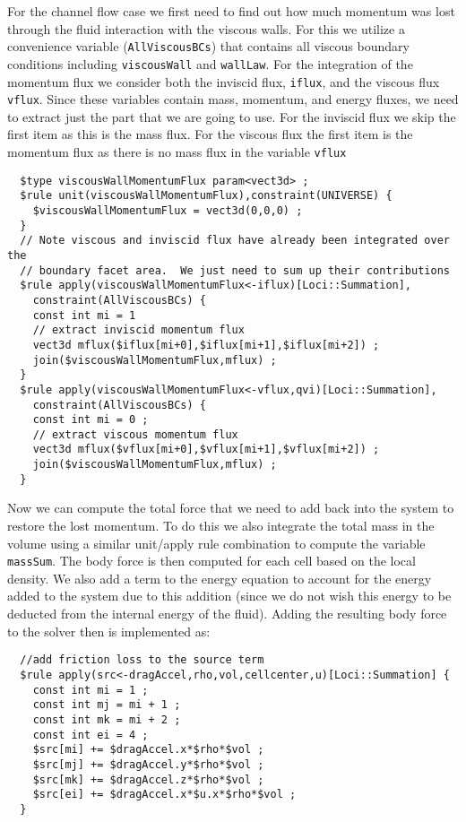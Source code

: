 \documentclass[letterpaper,twoside]{article}
\begin{document}
For the channel flow case we first need to find out how much momentum
was lost through the fluid interaction with the viscous walls.  For
this we utilize a convenience variable ({\tt AllViscousBCs}) that
contains all viscous boundary conditions including {\tt viscousWall}
and {\tt wallLaw}.  For the integration of the momentum flux we
consider both the inviscid flux, {\tt iflux}, and the viscous flux
{\tt vflux}.  Since these variables contain mass, momentum, and energy
fluxes, we need to extract just the part that we are going to use.
For the inviscid flux we skip the first item as this is the mass flux.
For the viscous flux the first item is the momentum flux as there is
no mass flux in the variable {\tt vflux}

\begin{verbatim}
  $type viscousWallMomentumFlux param<vect3d> ;
  $rule unit(viscousWallMomentumFlux),constraint(UNIVERSE) {
    $viscousWallMomentumFlux = vect3d(0,0,0) ;
  }
  // Note viscous and inviscid flux have already been integrated over the 
  // boundary facet area.  We just need to sum up their contributions
  $rule apply(viscousWallMomentumFlux<-iflux)[Loci::Summation],
    constraint(AllViscousBCs) {
    const int mi = 1
    // extract inviscid momentum flux
    vect3d mflux($iflux[mi+0],$iflux[mi+1],$iflux[mi+2]) ; 
    join($viscousWallMomentumFlux,mflux) ;
  }
  $rule apply(viscousWallMomentumFlux<-vflux,qvi)[Loci::Summation],
    constraint(AllViscousBCs) {
    const int mi = 0 ;
    // extract viscous momentum flux
    vect3d mflux($vflux[mi+0],$vflux[mi+1],$vflux[mi+2]) ; 
    join($viscousWallMomentumFlux,mflux) ;
  }
\end{verbatim}

Now we can compute the total force that we need to add back into the
system to restore the lost momentum. To do this we also integrate the
total mass in the volume using a similar unit/apply rule combination
to compute the variable {\tt massSum}.  The body force is then
computed for each cell based on the local density.  We also add a term
to the energy equation to account for the energy added to the system
due to this addition (since we do not wish this energy to be deducted
from the internal energy of the fluid).  Adding the resulting body
force to the solver then is implemented as:
\begin{verbatim}
  //add friction loss to the source term
  $rule apply(src<-dragAccel,rho,vol,cellcenter,u)[Loci::Summation] {
    const int mi = 1 ;
    const int mj = mi + 1 ;
    const int mk = mi + 2 ;
    const int ei = 4 ;
    $src[mi] += $dragAccel.x*$rho*$vol ;
    $src[mj] += $dragAccel.y*$rho*$vol ;
    $src[mk] += $dragAccel.z*$rho*$vol ;
    $src[ei] += $dragAccel.x*$u.x*$rho*$vol ;
  }
\end{verbatim}
\end{document}
